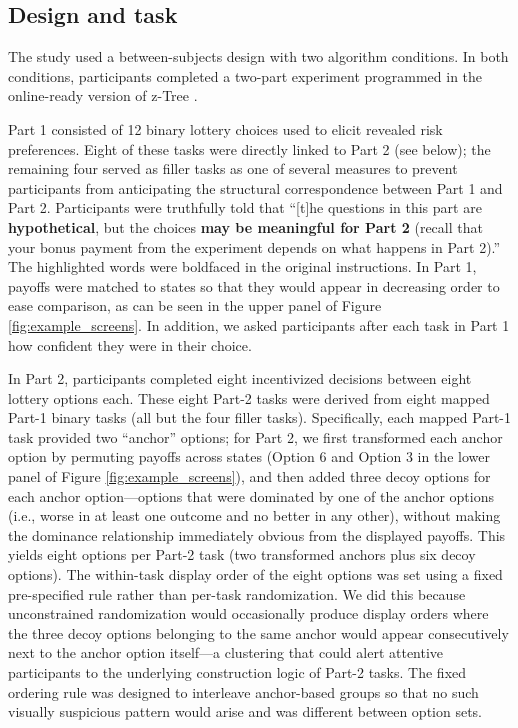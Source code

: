 \documentclass[a4paper, 12pt, fleqn]{article}
\theoremstyle{definition}
\begin{document}
\subsection{Design and task}
The study used a between-subjects design with two algorithm conditions. In both conditions, participants completed a two-part experiment programmed in the online-ready version of z-Tree \citep{Fischbacher07}.

Part 1 consisted of 12 binary lottery choices used to elicit revealed risk preferences. Eight of these tasks were directly linked to Part 2 (see below); the remaining four served as filler tasks as one of several measures to prevent participants from anticipating the structural correspondence between Part 1 and Part 2. Participants were truthfully told that ``[t]he questions in this part are \textbf{hypothetical}, but the choices \textbf{may be meaningful for Part 2} (recall that your bonus payment from the experiment depends on what happens in Part 2).'' The highlighted words were boldfaced in the original instructions. In Part 1, payoffs were matched to states so that they would appear in decreasing order to ease comparison, as can be seen in the upper panel of Figure \ref{fig:example_screens}. In addition, we asked participants after each task in Part 1 how confident they were in their choice.

In Part 2, participants completed eight incentivized decisions between eight lottery options each. These eight Part-2 tasks were derived from eight mapped Part-1 binary tasks (all but the four filler tasks). Specifically, each mapped Part-1 task provided two ``anchor'' options; for Part 2, we first transformed each anchor option by permuting payoffs across states (Option 6 and Option 3 in the lower panel of Figure \ref{fig:example_screens}), and then added three decoy options for each anchor option---options that were dominated by one of the anchor options (i.e., worse in at least one outcome and no better in any other), without making the dominance relationship immediately obvious from the displayed payoffs. This yields eight options per Part-2 task (two transformed anchors plus six decoy options). The within-task display order of the eight options was set using a fixed pre-specified rule rather than per-task randomization. We did this because unconstrained randomization would occasionally produce display orders where the three decoy options belonging to the same anchor would appear consecutively next to the anchor option itself---a clustering that could alert attentive participants to the underlying construction logic of Part-2 tasks. The fixed ordering rule was designed to interleave anchor-based groups so that no such visually suspicious pattern would arise and was different between option sets.
\end{document}

